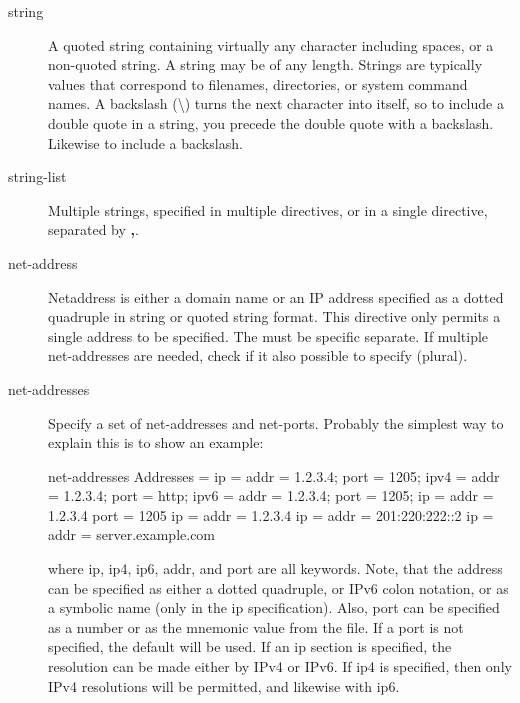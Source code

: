 \begin{description}
\item [string]
    \label{DataTypeString}
   A quoted string containing virtually any  character including spaces, or a
non-quoted string. A  string may be of any length. Strings are typically
values  that correspond to filenames, directories, or system  command names. A
backslash (\textbackslash{}) turns the next character into  itself, so to
include a double quote in a string, you precede the  double quote with a
backslash. Likewise to include a backslash.


\item [string-list]
    \label{DataTypeStringList}
    Multiple strings, specified in multiple directives, or in a single directive, separated by \textbf{,}.




\item [net-address]
    \label{DataTypeNetAddress}
Netaddress is either a domain name or an IP address specified as a
dotted quadruple in string or quoted string format.
This directive only permits a single address to be specified.
The \dtNetPort must be specific separate.
If multiple net-addresses are needed, check if it also possible to specify \dtNetAddresses (plural). 


\item [net-addresses]
    \label{DataTypeNetAddresses}
Specify a set of net-addresses and net-ports.
Probably the simplest way to explain
this is to show an example:

\begin{bconfig}{net-addresses}
Addresses  = {
    ip = { addr = 1.2.3.4; port = 1205;}
    ipv4 = {
        addr = 1.2.3.4; port = http;}
    ipv6 = {
        addr = 1.2.3.4;
        port = 1205;
    }
    ip = {
        addr = 1.2.3.4
        port = 1205
    }
    ip = { addr = 1.2.3.4 }
    ip = { addr = 201:220:222::2 }
    ip = {
        addr = server.example.com
    }
}
\end{bconfig}

where ip, ip4, ip6, addr, and port are all keywords. Note, that  the address
can be specified as either a dotted quadruple, or  IPv6 colon notation, or as
a symbolic name (only in the ip specification).  Also, port can be specified
as a number or as the mnemonic value from  the  file.  If a port
is not specified, the default will be used. If an ip  section is specified,
the resolution can be made either by IPv4 or  IPv6. If ip4 is specified, then
only IPv4 resolutions will be permitted,  and likewise with ip6.



\end{description}
